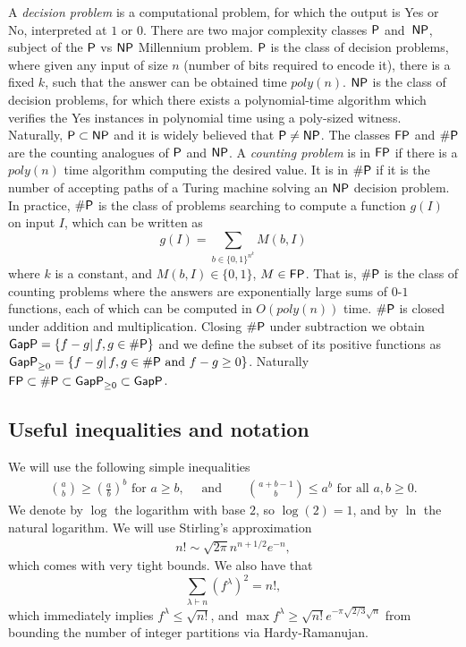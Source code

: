 \documentclass[11pt]{amsart}
\newcommand{\darkblue}{\color{darkblue}}
\newcommand{\defn}[1]{\emph{\darkblue #1}}
\theoremstyle{plain}
\theoremstyle{definition}
\numberwithin{equation}{section}
\newcommand{\la}{\lambda}
\def\P{{{\rm{\textsf{P}} }}}
\def\FP{{\rm{\textsf{FP}}}}
\def\SP{{{\rm{\textsf{\#P}}}}}
\def\GapP{{{\rm{\textsf{GapP}} }}}
\def\FP{{{}\rm{\textsf{FP}} }}
\def\NP{{{\rm{\textsf{NP}} }}}
\newcommand{\poly}{poly}
\def\la{\lambda}
\begin{document}
A \defn{decision problem} is a computational problem, for which the output is Yes or No, interpreted at $1$ or $0$. There are two major complexity classes $\P$ and~$\NP$, subject of the $\P$ vs $\NP$ Millennium problem. $\P$ is the class of decision problems, where given any input of size $n$ (number of bits required to encode it), there is a fixed $k$, such that the answer can be obtained  time $\poly(n)$. $\NP$ is the class of decision problems, for which there exists a polynomial-time algorithm which verifies the Yes instances in polynomial time using a poly-sized witness.  Naturally, $\P \subset \NP$ and it is widely believed that $\P \neq \NP$.
%
%
%
The classes $\FP$ and $\SP$ are the counting analogues of $\P$ and $\NP$. A \defn{counting problem} is in $\FP$ if there is a $\poly(n)$ time algorithm computing the desired value. It is in $\SP$ if it is the number of accepting paths of a Turing machine solving an $\NP$ decision problem. In practice, $\SP$ is the class of problems searching to compute a function $g(I)$ on input $I$, which can be written as
$$ g(I) = \sum_{b \in \{0,1\}^{n^k} } M(b,I)$$
where $k$ is a constant, and $M(b,I)\in\{0,1\}$, $M \in \FP$.  That is, $\SP$ is the class of counting problems where the answers are exponentially large sums of $0$-$1$ functions, each of which can be computed in $O(\poly(n))$ time. $\SP$ is closed under addition and multiplication. Closing $\SP$ under subtraction we obtain $\GapP = \{ f-g |\, f,g \in \SP\}$ and we define the subset of its positive functions as $\GapP_{\geq 0} = \{ f-g | \, f,g \in \SP \text{ and } f-g \geq 0\}$. Naturally $\FP \subset \SP \subset \GapP_{\geq 0} \subset \GapP$. 

\subsection{Useful inequalities and notation}

We will use the following simple inequalities
\begin{align}\label{ineq:binom1}
\binom{a}{b} \geq \left(\frac{a}{b}\right)^b \text{ for $a \geq b$}, \quad \text{ and} \qquad \binom{a+b-1}{b} \leq a^b \text { for all $a,b \geq 0$}.
\end{align}
We denote by $\log$ the logarithm with base $2$, so $\log(2)=1$, and by $\ln$ the natural logarithm. We will use Stirling's approximation
\begin{align}\label{ineq:stirling}
n! \sim \sqrt{2\pi} n^{n+1/2} e^{-n}, 
\end{align}
which comes with very tight bounds. We also have that 
$$\sum_{\la \vdash n} (f^\la)^2 =n!,$$
which immediately implies $f^\la \leq \sqrt{n!}$, and $\max f^\la \geq \sqrt{n!}e^{-\pi\sqrt{2/3} \sqrt{n}}$ from bounding the number of integer partitions via Hardy-Ramanujan. 
\end{document}
